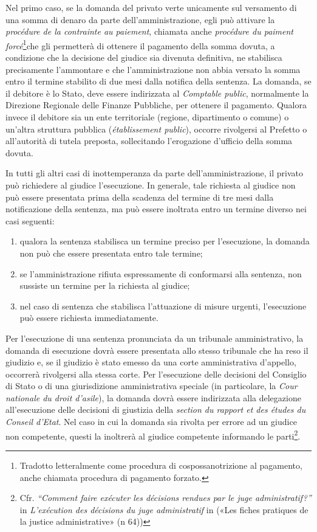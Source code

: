 \documentclass[12pt,it,a4paper,]{report}
\providecommand{\tightlist}{%
  \setlength{\itemsep}{0pt}\setlength{\parskip}{0pt}}
\begin{document}
Nel primo caso, se la domanda del privato verte unicamente sul
versamento di una somma di denaro da parte dell'amministrazione, egli
può attivare la \emph{procédure de la contrainte au paiement}, chiamata
anche \emph{procédure du paiment forcé}\footnote{Tradotto letteralmente
  come procedura di cospossanotrizione al pagamento, anche chiamata
  procedura di pagamento forzato.}che gli permetterà di ottenere il
pagamento della somma dovuta, a condizione che la decisione del giudice
sia divenuta definitiva, ne stabilisca precisamente l'ammontare e che
l'amministrazione non abbia versato la somma entro il termine stabilito
di due mesi dalla notifica della sentenza. La domanda, se il debitore è
lo Stato, deve essere indirizzata al \emph{Comptable public},
normalmente la Direzione Regionale delle Finanze Pubbliche, per ottenere
il pagamento. Qualora invece il debitore sia un ente territoriale
(regione, dipartimento o comune) o un'altra struttura pubblica
(\emph{établissement public}), occorre rivolgersi al Prefetto o
all'autorità di tutela preposta, sollecitando l'erogazione d'ufficio
della somma dovuta.

In tutti gli altri casi di inottemperanza da parte dell'amministrazione,
il privato può richiedere al giudice l'esecuzione. In generale, tale
richiesta al giudice non può essere presentata prima della scadenza del
termine di tre mesi dalla notificazione della sentenza, ma può essere
inoltrata entro un termine diverso nei casi seguenti:

\begin{enumerate}
\def\labelenumi{\arabic{enumi})}
\tightlist
\item
  qualora la sentenza stabilisca un termine preciso per l'esecuzione, la
  domanda non può che essere presentata entro tale termine;
\item
  se l'amministrazione rifiuta espressamente di conformarsi alla
  sentenza, non sussiste un termine per la richiesta al giudice;
\item
  nel caso di sentenza che stabilisca l'attuazione di misure urgenti,
  l'esecuzione può essere richiesta immediatamente.
\end{enumerate}

Per l'esecuzione di una sentenza pronunciata da un tribunale
amministrativo, la domanda di esecuzione dovrà essere presentata allo
stesso tribunale che ha reso il giudizio e, se il giudizio è stato
emesso da una corte amministrativa d'appello, occorrerà rivolgersi alla
stessa corte. Per l'esecuzione delle decisioni del Consiglio di Stato o
di una giurisdizione amministrativa speciale (in particolare, la
\emph{Cour nationale du droit d'asile}), la domanda dovrà essere
indirizzata alla delegazione all'esecuzione delle decisioni di giustizia
della \emph{section du rapport et des études du Conseil d'Etat}. Nel
caso in cui la domanda sia rivolta per errore ad un giudice non
competente, questi la inoltrerà al giudice competente informando le
parti\footnote{Cfr. \emph{``Comment faire exécuter les décisions rendues
  par le juge administratif?''} in \emph{L'exécution des décisions du
  juge administratif} in ({«Les fiches pratiques de la justice
  administrative»} (n 64))}.
\end{document}
